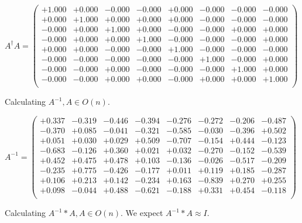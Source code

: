 \documentclass[9pt]{article}
\theoremstyle{plain}
\theoremstyle{definition}
\theoremstyle{remark}
\numberwithin{equation}{section}
\begin{document}
$A^{\dag} A = \left(
\begin{array}{
cccccccc}
+1.000 & +0.000 & -0.000 & -0.000 & +0.000 & -0.000 & -0.000 & -0.000 \\
+0.000 & +1.000 & +0.000 & +0.000 & +0.000 & -0.000 & -0.000 & -0.000 \\
-0.000 & +0.000 & +1.000 & +0.000 & -0.000 & -0.000 & +0.000 & +0.000 \\
-0.000 & +0.000 & +0.000 & +1.000 & -0.000 & -0.000 & -0.000 & +0.000 \\
+0.000 & +0.000 & -0.000 & -0.000 & +1.000 & -0.000 & -0.000 & -0.000 \\
-0.000 & -0.000 & -0.000 & -0.000 & -0.000 & +1.000 & -0.000 & +0.000 \\
-0.000 & -0.000 & +0.000 & -0.000 & -0.000 & -0.000 & +1.000 & +0.000 \\
-0.000 & -0.000 & +0.000 & +0.000 & -0.000 & +0.000 & +0.000 & +1.000 \\
\end{array}
\right)$ \newline 

Calculating $A^{-1} ,  A \in O(n)$.

$A^{-1} = \left(
\begin{array}{
cccccccc}
+0.337 & -0.319 & -0.446 & -0.394 & -0.276 & -0.272 & -0.206 & -0.487 \\
-0.370 & +0.085 & -0.041 & -0.321 & -0.585 & -0.030 & -0.396 & +0.502 \\
+0.051 & +0.030 & +0.029 & +0.509 & -0.707 & -0.154 & +0.444 & -0.123 \\
-0.683 & -0.126 & +0.360 & +0.021 & +0.032 & -0.270 & -0.152 & -0.539 \\
+0.452 & +0.475 & +0.478 & +0.103 & -0.136 & -0.026 & -0.517 & -0.209 \\
-0.235 & +0.775 & -0.426 & -0.177 & +0.011 & +0.119 & +0.185 & -0.287 \\
+0.106 & +0.213 & +0.142 & -0.234 & +0.163 & -0.839 & +0.270 & +0.255 \\
+0.098 & -0.044 & +0.488 & -0.621 & -0.188 & +0.331 & +0.454 & -0.118 \\
\end{array}
\right)$ \newline 

Calculating $A^{-1} *A  ,  A \in O(n)$.   We expect $A^{-1} *A  \approx I$. 
\end{document}
